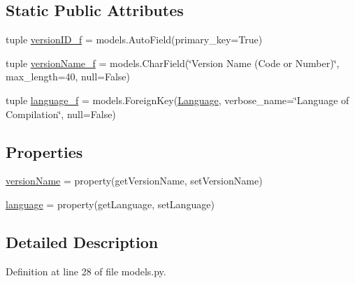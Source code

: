 \subsection*{Static Public Attributes}
\begin{DoxyCompactItemize}
\item 
tuple \hyperlink{class_ecodena_1_1_compiler_1_1models_1_1_compiler_version_a16ef12e2574c9d71dd514664e1f90a2a}{versionID\_\-f} = models.AutoField(primary\_\-key=True)
\item 
tuple \hyperlink{class_ecodena_1_1_compiler_1_1models_1_1_compiler_version_a9be00a776bb40cc37f23b40c7b986ff5}{versionName\_\-f} = models.CharField(\char`\"{}Version Name (Code or Number)\char`\"{}, max\_\-length=40, null=False)
\item 
tuple \hyperlink{class_ecodena_1_1_compiler_1_1models_1_1_compiler_version_a1ae530279bdfebe2e9fbed403cbc89fc}{language\_\-f} = models.ForeignKey(\hyperlink{class_ecodena_1_1_compiler_1_1models_1_1_language}{Language}, verbose\_\-name=\char`\"{}Language of Compilation\char`\"{}, null=False)
\end{DoxyCompactItemize}
\subsection*{Properties}
\begin{DoxyCompactItemize}
\item 
\hyperlink{class_ecodena_1_1_compiler_1_1models_1_1_compiler_version_ab2dc0346206f234f5731a9bd0591cee6}{versionName} = property(getVersionName, setVersionName)
\item 
\hyperlink{class_ecodena_1_1_compiler_1_1models_1_1_compiler_version_a85336927773b44cf99358d191699d97f}{language} = property(getLanguage, setLanguage)
\end{DoxyCompactItemize}


\subsection{Detailed Description}


Definition at line 28 of file models.py.



